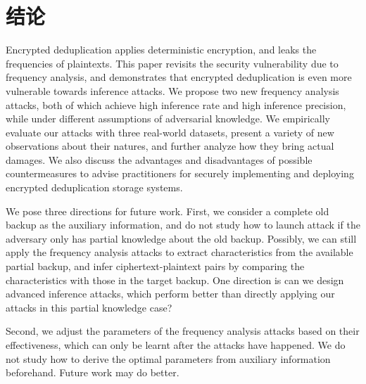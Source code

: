 \chapter{结论}
\label{sec:Conclusion}

Encrypted deduplication applies deterministic encryption, and leaks the frequencies of plaintexts. This paper revisits the security vulnerability  due to frequency analysis, and demonstrates that encrypted deduplication is even more vulnerable towards inference attacks. We propose two new frequency analysis attacks, both of which  achieve high inference rate and high inference precision, while under different assumptions of adversarial knowledge. We empirically evaluate our attacks with three real-world datasets, present a variety of new observations about their natures, and further analyze how they bring actual damages. We also discuss the advantages and disadvantages of possible countermeasures to advise practitioners for securely implementing and deploying encrypted deduplication storage systems. 


 We pose three directions for future work. First, we consider a complete old backup as the auxiliary information, and do not study how to launch attack if the adversary only has partial knowledge about the old backup. Possibly, we can still apply the frequency analysis attacks to extract characteristics from the available partial backup, and infer ciphertext-plaintext pairs by comparing the characteristics with those in the target backup. One direction is can we design advanced inference attacks, which  perform better than directly applying our attacks in this partial knowledge case?  
 
 
 Second, we adjust the parameters of the frequency analysis attacks based on their effectiveness, which can only be learnt after the attacks have happened. We do not study how to derive the optimal parameters from auxiliary information beforehand. Future work may do better. 
 
 
